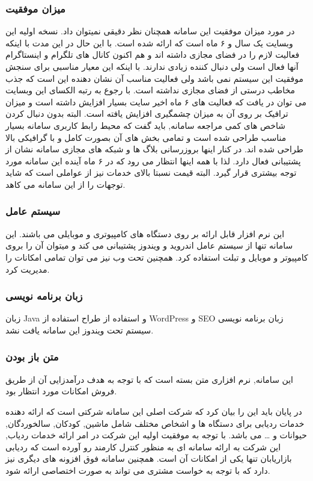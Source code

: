 \subsubsection{میزان موفقیت}
در مورد میزان موفقیت این سامانه همچنان نظر دقیقی نمیتوان داد. نسخه اولیه این وبسایت یک سال و ۶ ماه است که ارائه شده است. با این حال در این مدت با اینکه فعالیت لازم را در فضای مجازی داشته اند و هم اکنون کانال های تلگرام و اینستاگرام آنها فعال است ولی دنبال کننده زیادی ندارند. با اینکه این معیار مناسبی برای سنجش موفقیت این سیستم نمی باشد ولی فعالیت مناسب آن نشان دهنده این است که جذب مخاطب درستی از فضای مجازی نداشته است. با رجوع به رتبه الکسای این وبسایت می توان در یافت که فعالیت های ۶ ماه اخیر سایت بسیار افزایش داشته است و میزان ترافیک بر روی آن به میزان چشمگیری افزایش یافته است. 
البته بدون دنبال کردن شاخص های کمی مراجعه سامانه, باید گفت که محیط رابط کاربری سامانه بسیار مناسب طراحی شده است و تمامی بخش های آن بصورت کامل و با گرافیکی بالا طراحی شده اند. در کنار اینها بروزرسانی بلاگ ها و شبکه های مجازی سامانه نشان از پشتیبانی فعال دارد. لذا با همه اینها انتظار می رود که در ۶ ماه آينده این سامانه مورد توجه بیشتری قرار گیرد. البته قیمت نسبتا بالای خدمات نیز از عواملی است که شاید توجهات را از این سامانه می کاهد.

\subsubsection{سیستم عامل}
این نرم افزار قابل ارائه بر روی دستگاه های کامپیوتری و موبایلی می باشند. این سامانه تنها از سیستم عامل اندروید و ویندوز پشتیبانی می کند و میتوان آن را بروی کامپیوتر و موبایل و تبلت استفاده کرد. همچنین تحت وب نیز می توان تمامی امکانات را مدیریت کرد.

\subsubsection{زبان برنامه نویسی}
زبان Java و استفاده از 
طراح 
استفاده از WordPress و SEO
زبان برنامه نویسی سیستم تحت ویندوز این سامانه یافت نشد.

\subsubsection{متن باز بودن}

این سامانه, نرم افزاری متن بسته است که با توجه به هدف درآمدزایی آن از طریق فروش امکانات مورد انتظار بود.

در پایان باید این را بیان کرد که شرکت اصلی این سامانه شرکتی است که ارائه دهنده خدمات ردیابی برای دستگاه ها و اشخاص مختلف شامل ماشین, کودکان, سالخوردگان, حیوانات و … می باشد. با توجه به موفقیت اولیه این شرکت در امر ارائه خدمات ردیاب, این شرکت به ارائه سامانه ای به منظور کنترل کارمند رو آورده است که ردیابی بازاریابان تنها یکی از امکانات آن است. همچنین سامانه فوق افزونه های دیگری نیز دارد که با توجه به خواست مشتری می تواند به صورت اختصاصی ارائه شود.

